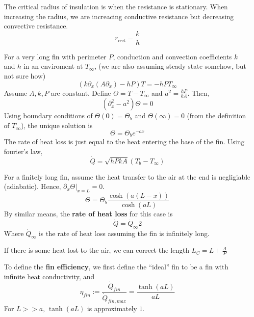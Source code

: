 \documentclass[a4paper]{article}
\numberwithin{equation}{section}
\begin{document}
	The critical radius of insulation is when the resistance is stationary. When increasing the radius, we are increacing conductive resistance but decreasing convective resistance. 
	\begin{equation}
		r_{crit}=\frac{k}{h}
	\end{equation}

	For a very long fin with perimeter $P$, conduction and convection coefficients $k$ and $h$ in an enviroment at $T_\infty$, (we are also assuming steady state somehow, but not sure how)
	\begin{equation}
		(k\partial_x(A\partial_x)-hP)T=-hPT_\infty
	\end{equation}
	Assume $A,k,P$ are constant. Define $\Theta=T-T_\infty$ and $a^2=\frac{hP}{kA}$. Then,
	\begin{equation}
		(\partial^2_x-a^2)\Theta=0
	\end{equation}
	Using boundary conditions of $\Theta(0)=\Theta_b$ and $\Theta(\infty)=0$ (from the definition of $T_\infty$), the unique solution is
	\begin{equation}
		\Theta=\Theta_be^{-ax}
	\end{equation}
	The rate of heat loss is just equal to the heat entering the base of the fin. Using fourier's law,
	\begin{equation}
		\dot Q=\sqrt{hPkA}(T_b-T_\infty)
	\end{equation}

	For a finitely long fin, assume the heat transfer to the air at the end is negligiable (adiabatic). Hence, $\partial_x\Theta|_{x=L}=0$.	
	\begin{equation}
		\Theta=\Theta_b\frac{\cosh(a(L-x))}{\cosh(aL)}
	\end{equation}
	By similar means, the \textbf{rate of heat loss} for this case is
	\begin{equation}
		\dot Q=\dot Q_\infty2
	\end{equation}
	Where $\dot Q_\infty$ is the rate of heat loss assuming the fin is infinitely long.

	If there is some heat lost to the air, we can correct the length $L_C=L+\frac{A}{P}$

	To define the \textbf{fin efficiency}, we first define the ``ideal'' fin to be a fin with infinite heat conductivity, and 
	\begin{equation}
		\eta_{fin}:=\frac{\dot Q_{fin}}{\dot Q_{fin,max}}=\frac{\tanh(aL)}{aL}
	\end{equation}
	For $L>>a$, $\tanh(aL)$ is approximately $1$.
\end{document}
